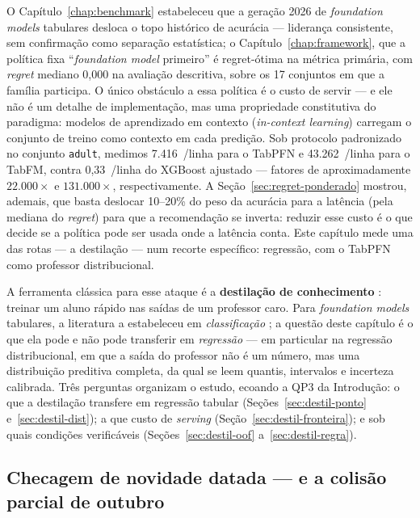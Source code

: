O Capítulo~\ref{chap:benchmark} estabeleceu que a geração 2026 de
\emph{foundation models} tabulares desloca o topo histórico de
acurácia --- liderança consistente, sem confirmação como separação
estatística; o
Capítulo~\ref{chap:framework}, que a política fixa ``\emph{foundation model}
primeiro'' é regret-ótima na métrica primária, com \emph{regret}
mediano 0,000 na avaliação descritiva, sobre os 17 conjuntos em que a
família participa. O único obstáculo a
essa política é o custo de servir --- e ele não é um detalhe de
implementação, mas uma propriedade constitutiva do paradigma: modelos
de aprendizado em contexto (\emph{in-context learning}) carregam o
conjunto de treino como contexto em cada predição. Sob protocolo
padronizado no conjunto \texttt{adult}, medimos 7.416~\us/linha para o
TabPFN e 43.262~\us/linha para o TabFM, contra 0,33~\us/linha do
XGBoost ajustado --- fatores de aproximadamente $22.000\times$ e
$131.000\times$, respectivamente. A Seção~\ref{sec:regret-ponderado}
mostrou, ademais, que basta deslocar 10--20\% do peso da acurácia para
a latência (pela mediana do \emph{regret}) para que a recomendação se
inverta: reduzir esse custo é o
que decide se a política pode ser usada onde a latência conta. Este
capítulo mede uma das rotas --- a destilação --- num recorte
específico: regressão, com o TabPFN como professor distribucional.

A ferramenta clássica para esse ataque é a \textbf{destilação de
conhecimento} \citep{bucila2006,hinton2015}: treinar um aluno rápido
nas saídas de um professor caro. Para \emph{foundation models} tabulares, a
literatura a estabeleceu em \emph{classificação}
\citep{pocketfm2026}; a questão deste capítulo é o que ela pode e não
pode transferir em \emph{regressão} --- em particular na regressão
distribucional, em que a saída do professor não é um número, mas uma
distribuição preditiva completa, da qual se leem quantis, intervalos e
incerteza calibrada. Três perguntas organizam o estudo, ecoando a
QP3 da Introdução: o que a destilação transfere em regressão tabular
(Seções~\ref{sec:destil-ponto} e~\ref{sec:destil-dist}); a que custo de
\emph{serving} (Seção~\ref{sec:destil-fronteira}); e sob quais condições
verificáveis (Seções~\ref{sec:destil-oof}
a~\ref{sec:destil-regra}).

\subsection{Checagem de novidade datada --- e a colisão parcial de
outubro}
\label{sec:destil-novidade}


